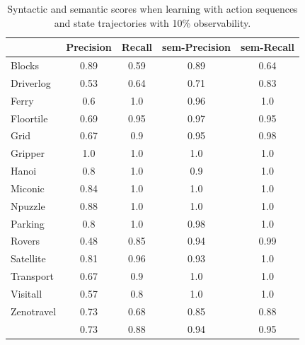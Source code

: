 \begin{table}[hbt!]
     \begin{footnotesize}
	 \begin{center}		
		\begin{tabular}{l|c|c|c|c|}		
			& {\bf Precision} & {\bf Recall} & {\bf sem-Precision} & {\bf sem-Recall} \\
			\hline
			Blocks & 0.89 & 0.59 & 0.89 & 0.64 \\
			Driverlog & 0.53 & 0.64 & 0.71 & 0.83 \\
			Ferry & 0.6 & 1.0 & 0.96 & 1.0 \\
			Floortile & 0.69 & 0.95 & 0.97 & 0.95 \\
			Grid & 0.67 & 0.9 & 0.95 & 0.98 \\
			Gripper & 1.0 & 1.0 & 1.0 & 1.0 \\
			Hanoi & 0.8 & 1.0 & 0.9 & 1.0 \\
			Miconic & 0.84 & 1.0 & 1.0 & 1.0 \\
			Npuzzle & 0.88 & 1.0 & 1.0 & 1.0 \\
			Parking & 0.8 & 1.0 & 0.98 & 1.0 \\
			Rovers & 0.48 & 0.85 & 0.94 & 0.99 \\
			Satellite & 0.81 & 0.96 & 0.93 & 1.0 \\
			Transport & 0.67 & 0.9 & 1.0 & 1.0 \\
			Visitall & 0.57 & 0.8 & 1.0 & 1.0 \\
			Zenotravel & 0.73 & 0.68 & 0.85 & 0.88 \\
			\hline
			& 0.73 & 0.88 & 0.94 & 0.95
		\end{tabular}
	 \end{center}
     \end{footnotesize}
     \caption{\small Syntactic and semantic scores when learning with \FO action sequences and \PO state trajectories with 10\% observability.}
     \label{tab:metric_comparison_100_10}
\end{table}


